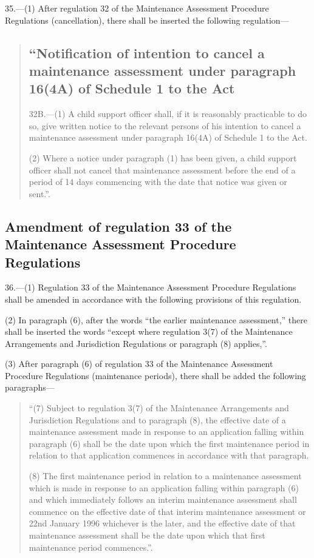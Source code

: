 \documentclass[a4paper]{article}
\begin{document}
35.—(1) After regulation 32 of the Maintenance Assessment Procedure Regulations (cancellation), there shall be inserted the following regulation—
\begin{quotation}
\subsection*{“Notification of intention to cancel a maintenance assessment under paragraph 16(4A) of Schedule 1 to the Act}

32B.—(1) A child support officer shall, if it is reasonably practicable to do so, give written notice to the relevant persons of his intention to cancel a maintenance assessment under paragraph 16(4A) of Schedule 1 to the Act.

(2) Where a notice under paragraph (1) has been given, a child support officer shall not cancel that maintenance assessment before the end of a period of 14 days commencing with the date that notice was given or sent.”.
\end{quotation}

\subsection[36. Amendment of regulation 33 of the Maintenance Assessment Procedure Regulations]{Amendment of regulation 33 of the Maintenance Assessment Procedure Regulations}

36.—(1) Regulation 33 of the Maintenance Assessment Procedure Regulations shall be amended in accordance with the following provisions of this regulation.

(2) In paragraph (6), after the words “the earlier maintenance assessment,” there shall be inserted the words “except where regulation 3(7) of the Maintenance Arrangements and Jurisdiction Regulations or paragraph (8) applies,”.

(3) After paragraph (6) of regulation 33 of the Maintenance Assessment Procedure Regulations (maintenance periods), there shall be added the following paragraphs—
\begin{quotation}
“(7) Subject to regulation 3(7) of the Maintenance Arrangements and Jurisdiction Regulations and to paragraph (8), the effective date of a maintenance assessment made in response to an application falling within paragraph (6) shall be the date upon which the first maintenance period in relation to that application commences in accordance with that paragraph.

(8) The first maintenance period in relation to a maintenance assessment which is made in response to an application falling within paragraph (6) and which immediately follows an interim maintenance assessment shall commence on the effective date of that interim maintenance assessment or 22nd January 1996 whichever is the later, and the effective date of that maintenance assessment shall be the date upon which that first maintenance period commences.”.
\end{quotation}
\end{document}

